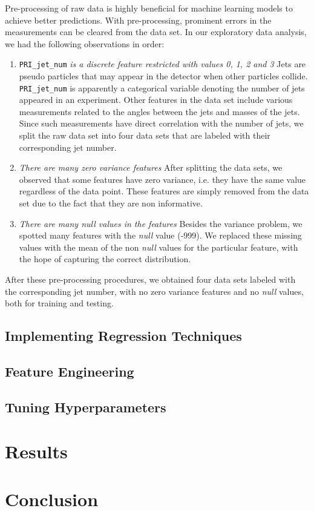 \documentclass[10pt,conference,compsocconf]{IEEEtran}
\begin{document}
Pre-processing of raw data is highly beneficial for machine learning models to achieve better predictions. With pre-processing, prominent errors in the measurements can be cleared from the data set. In our exploratory data analysis, we had the following observations in order:

\begin{enumerate}
\item \verb|PRI_jet_num| \textit{is a discrete feature restricted with values 0, 1, 2 and 3} \smallskip
\newline 
Jets are pseudo particles that may appear in the detector when other particles collide. \verb|PRI_jet_num| is apparently a categorical variable denoting the number of jets appeared in an experiment. Other features in the data set include various measurements related to the angles between the jets and masses of the jets. Since such measurements have direct correlation with the number of jets, we split the raw data set into four data sets that are labeled with their corresponding jet number. \smallskip
\item \textit{There are many zero variance features} \smallskip
\newline
After splitting the data sets, we observed that some features have zero variance, i.e. they have the same value regardless of the data point. These features are simply removed from the data set due to the fact that they are non informative. \smallskip
\item \textit{There are many null values in the features} \smallskip
\newline
Besides the variance problem, we spotted many features with the \emph{null} value (-999). We replaced these missing values with the mean of the non \emph{null} values for the particular feature, with the hope of capturing the correct distribution.
\end{enumerate}
After these pre-processing procedures, we obtained four data sets labeled with the corresponding jet number, with no zero variance features and no \emph{null} values, both for training and testing.

\subsection{Implementing Regression Techniques}
\subsection{Feature Engineering}
\subsection{Tuning Hyperparameters}

\section{Results}
\label{sec:tips-software}

\section{Conclusion}



\end{document}
